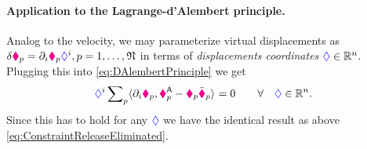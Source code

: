 \paragraph{Application to the Lagrange-d'Alembert principle.}
Analog to the velocity, we may parameterize virtual displacements as $\delta \boldsymbol{\textcolor{magenta}{\blacklozenge}}_{p} = \partial_{i} \boldsymbol{\textcolor{magenta}{\blacklozenge}}_{p} \textcolor{blue}{\Diamond}^{i}, p = 1,\ldots,\mathfrak{N}$ in terms of \textit{displacements coordinates} $\boldsymbol{\textcolor{blue}{\Diamond}}\in\mathbb{R}^n$.
Plugging this into \eqref{eq:DAlembertPrinciple} we get
\begin{align}\label{eq:DAlembertPrincipleBasis}
 \textcolor{blue}{\Diamond}^{i} \sum\nolimits_{p} \langle \partial_{i} \boldsymbol{\textcolor{magenta}{\blacklozenge}}_{p} , \boldsymbol{\textcolor{magenta}{\blacklozenge}}_{p}^{\mathsf{A}} - \textcolor{magenta}{\blacklozenge}_{p}\ddot{\boldsymbol{\textcolor{magenta}{\blacklozenge}}}_{p} \rangle_{} = 0 \qquad \forall \quad \boldsymbol{\textcolor{blue}{\Diamond}}\in\mathbb{R}^n.
\end{align}
Since this has to hold for any $\boldsymbol{\textcolor{blue}{\Diamond}}$ we have the identical result as above \eqref{eq:ConstraintReleaseEliminated}.

